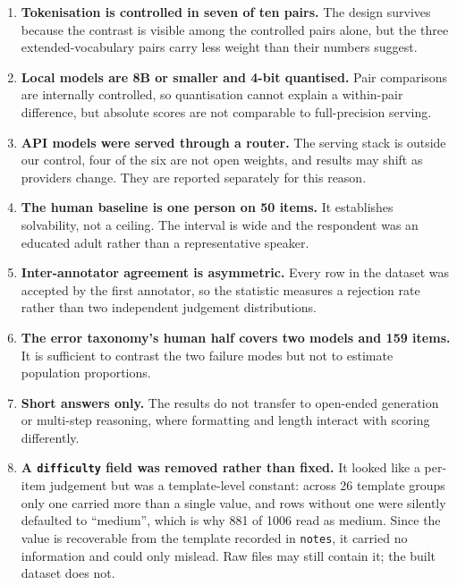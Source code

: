 \documentclass[final]{clv2025}
\begin{document}
\begin{enumerate}
\item \textbf{Tokenisation is controlled in seven of ten pairs.} The design
survives because the contrast is visible among the controlled pairs alone, but
the three extended-vocabulary pairs carry less weight than their numbers
suggest.

\item \textbf{Local models are 8B or smaller and 4-bit quantised.} Pair
comparisons are internally controlled, so quantisation cannot explain a
within-pair difference, but absolute scores are not comparable to
full-precision serving.

\item \textbf{API models were served through a router.} The serving stack is
outside our control, four of the six are not open weights, and results may
shift as providers change. They are reported separately for this reason.

\item \textbf{The human baseline is one person on 50 items.} It establishes
solvability, not a ceiling. The interval is wide and the respondent was an
educated adult rather than a representative speaker.

\item \textbf{Inter-annotator agreement is asymmetric.} Every row in the
dataset was accepted by the first annotator, so the statistic measures a
rejection rate rather than two independent judgement distributions.

\item \textbf{The error taxonomy's human half covers two models and 159
items.} It is sufficient to contrast the two failure modes but not to estimate
population proportions.

\item \textbf{Short answers only.} The results do not transfer to open-ended
generation or multi-step reasoning, where formatting and length interact with
scoring differently.

\item \textbf{A \texttt{difficulty} field was removed rather than fixed.} It
looked like a per-item judgement but was a template-level constant: across 26
template groups only one carried more than a single value, and rows without one
were silently defaulted to ``medium'', which is why 881 of 1006 read as medium.
Since the value is recoverable from the template recorded in \texttt{notes}, it
carried no information and could only mislead. Raw files may still contain it;
the built dataset does not.
\end{enumerate}
\end{document}
